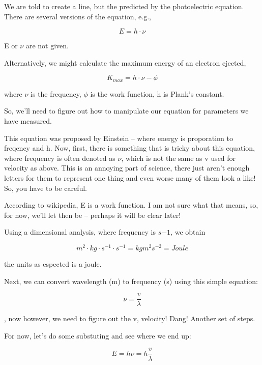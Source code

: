 \documentclass{article}
\begin{document}
We are told to create a line, but the predicted by the photoelectric equation. There are several versions of the equation, e.g.,

\begin{equation}
E = h \cdot \nu
\end{equation}

\noindent E or $\nu$ are not given. 

Alternatively, we might calculate the maximum energy of an electron ejected,

\begin{equation}
K_{max} = h \cdot \nu - \phi
\end{equation}

\noindent where $\nu$ is the frequency, $\phi$ is the work function, h is Plank's constant. 

So, we'll need to figure out how to manipulate our equation for parameters we have measured. 

This equation was proposed by Einstein -- where energy is proporation to freqency and h. Now, first, there is something that is tricky about this equation, where frequency is often denoted as $\nu$, which is not the same as v used for velocity as above. This is an annoying part of science, there just aren't enough letters for them to represent one thing and even worse many of them look a like! So, you have to be careful. 

According to wikipedia, E is a work function. I am not sure what that means, so, for now, we'll let then be -- perhaps it will be clear later!

Using a dimensional analysis, where frequency is $s{-1}$, we obtain

\begin{equation}
m^2 \cdot kg \cdot s^{-1} \cdot s^{-1} = kg m^2 s^{-2} = Joule
\end{equation}

\noindent the units as espected is a joule. 

Next, we can convert wavelength (m) to frequency (s) using this simple equation:

\begin{equation}
\nu = \frac{v}{\lambda}
\end{equation}

\noindent, now however, we need to figure out the v, velocity!  Dang!  Another set of steps. 

For now, let's do some substuting and see where we end up: 

\begin{equation}
E = h \nu = h \frac{v}{\lambda}
\end{equation}
\end{document}

